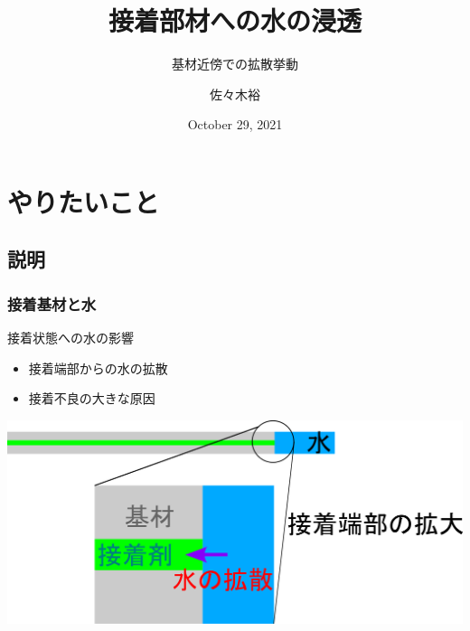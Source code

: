 \documentclass[12pt, dvipdfmx]{beamer}
\title
{接着部材への水の浸透}
\subtitle{基材近傍での拡散挙動}
\author[東亞合成　佐々木]{佐々木裕}
\institute[東亞合成]{東亞合成}
\date{October 29, 2021}
\begin{document}
\begin{frame}\frametitle{}
	\titlepage
\end{frame}

\section{やりたいこと}
\subsection{説明}

\begin{frame}
	\frametitle{接着基材と水}
        \begin{block}{接着状態への水の影響}
            \begin{itemize}
                \item 接着端部からの水の拡散
                \item 接着不良の大きな原因
            \end{itemize}
        \end{block}
        
				\begin{center}
					\includegraphics[width=.9\textwidth]{adherent_water.png}
				\end{center}
\end{frame}
\end{document}
